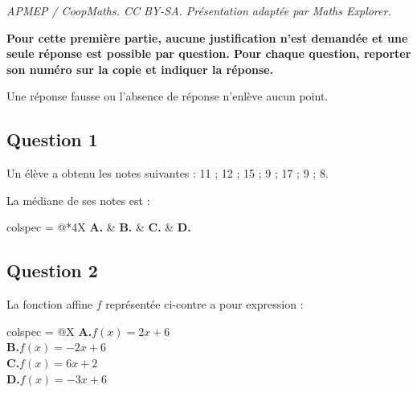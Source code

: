 \documentclass[10pt]{article}
\providecommand{\np}[2][]{{#2~#1}}
\begin{document}
\noindent\textit{APMEP / CoopMaths. CC BY-SA. Présentation adaptée par Maths Explorer.}\par\medskip
\textbf{Pour cette première partie, aucune justification n'est demandée et une seule réponse est possible par question. Pour chaque question, reporter son numéro sur la copie et indiquer la réponse.}

Une réponse fausse ou l'absence de réponse n'enlève aucun point.

\subsection*{Question 1}

Un élève a obtenu les notes suivantes : 11 ; 12 ; 15 ; 9 ; 17 ; 9 ; 8.

La médiane de ses notes est :

\medskip
\begin{tblr}{colspec = {@{}*{4}{X}}}
	\textbf{A.} &
	\textbf{B.} &
	\textbf{C.} &
	\textbf{D.} \\
\end{tblr}

\subsection*{Question 2}

\begin{minipage}[t]{0.6\linewidth}
	La fonction affine $f$ représentée ci-contre a pour expression :

	\medskip
	\begin{tblr}{colspec = {@{}X}}
		\textbf{A.}\quad $f(x) = 2x+6$ \\
		\textbf{B.}\quad $f(x) = -2x+6$ \\
		\textbf{C.}\quad $f(x) = 6x+2$ \\
		\textbf{D.}\quad $f(x) = -3x+6$ \\
	\end{tblr}
\end{minipage}
\hfill
{}
\end{document}
